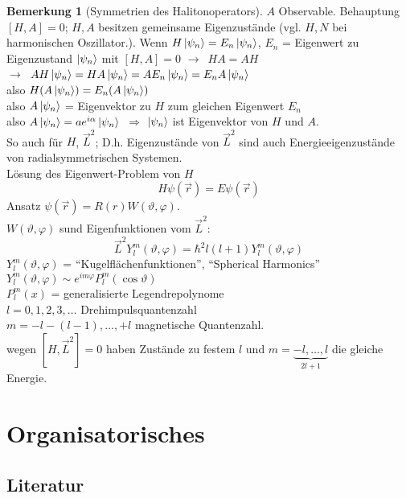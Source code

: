 \documentclass[oneside]{book}
\theoremstyle{definition}
\newtheorem*{bemerkung*}{Bemerkung}
\newcommand{\conseq}{$\rightarrow$~}
\newcommand{\vp}{\varphi}
\begin{document}
\begin{bemerkung*}[Symmetrien des Halitonoperators]
$A$ Observable. Behauptung $[H, A] = 0$; $H, A$ besitzen gemeinsame Eigenzustände (vgl. $H, N$ bei harmonischen Oszillator.).
Wenn $H \ket{\psi_n} = E_n \ket{\psi_n}$, $E_n$ = Eigenwert zu Eigenzustand $\ket{\psi_n}$ mit $[H, A] = 0$ \conseq $HA = AH$\\
\conseq $A H \ket{\psi_n} = H A \ket{\psi_n} = A E_n \ket{\psi_n} = E_n A \ket{\psi_n}$\\
also $H (A \ket{\psi_n}) = E_n (A \ket{\psi_n})$\\
also $A \ket{\psi_n}$ = Eigenvektor zu $H$ zum gleichen Eigenwert $E_n$\\
also $A \ket{\psi_n} = a e^{i \alpha} \ket{\psi_n}$\
$\Rightarrow$ $\ket{\psi_n}$ ist Eigenvektor von $H$ und $A$.\\
So auch für $H$, $\vec{L}^2$; D.h. Eigenzustände von $\vec{L}^2$ sind auch Energieeigenzustände von radialsymmetrischen Systemen.\\
Lösung des Eigenwert-Problem von $H$
$$H \psi(\vec{r}) = E \psi(\vec{r})$$
Ansatz $\psi(\vec{r}) = R(r) W(\vartheta, \vp)$.\\
$W(\vartheta, \vp)$ sund Eigenfunktionen vom  $\vec{L}^2$:
$$\vec{L}^2 Y_l^m(\vartheta, \vp) = \hbar^2 l (l + 1) Y_l^m(\vartheta, \vp)$$
$Y_l^m(\vartheta, \vp)$ = "`Kugelflächenfunktionen"', "`Spherical Harmonics"'\\
$Y_l^m(\vartheta, \vp) \sim e^{im \vp} P_l^m(\cos \vartheta)$\\
$P_l^m(x)$ = generalisierte Legendrepolynome\\
$l = 0, 1, 2, 3, \dots$ Drehimpulsquantenzahl\\
$m = -l -(l - 1), \dots, +l$ magnetische Quantenzahl.\\
wegen $[H, \vec{L}^2] = 0$ haben Zustände zu festem $l$ und $m = \underbrace{- l, \dots, l}_{2 l + 1}$ die gleiche Energie.
\end{bemerkung*}

\appendix


\chapter{Organisatorisches}

\section{Literatur}
\end{document}

